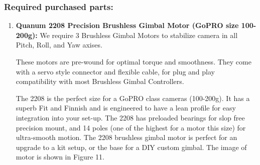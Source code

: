 \documentclass[11pt,a4paper]{article}
\begin{document}
		\subsubsection{Required purchased parts:}
		\begin{enumerate}
			\item \textbf{Quanum 2208 Precision Brushless Gimbal Motor (GoPRO size 100-200g):} We require 3 Brushless Gimbal Motors to stabilize camera in all Pitch, Roll, and Yaw axises. 
			
			These motors are pre-wound for optimal torque and smoothness. They come with a servo style connector and flexible cable, for plug and play compatibility with most Brushless Gimbal Controllers.
			
			The 2208 is the perfect size for a GoPRO class cameras (100-200g).  It has a superb Fit and Finnish and is engineered to have a lean profile for easy integration into your set-up. The 2208 has preloaded bearings for slop free precision mount, and 14 poles (one of the highest for a motor this size) for ultra-smooth motion. The 2208 brushless gimbal motor is perfect for an upgrade to a kit setup, or the base for a DIY custom gimbal. The image of motor is shown in Figure 11.
			

\end{enumerate}
\end{document}
